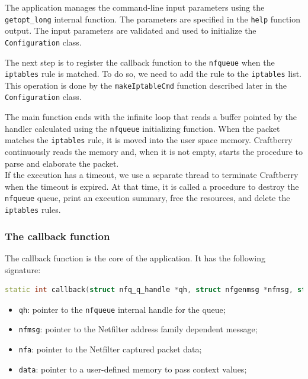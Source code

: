 \documentclass[12pt]{article}
\begin{document}
	The application manages the command-line input parameters using the \lstinline{getopt_long} internal function. The parameters are specified in the \lstinline{help} function output. The input parameters are validated and used to initialize the \lstinline{Configuration} class.\\
	\bigbreak

	The next step is to register the callback function to the \lstinline{nfqueue} when the \lstinline{iptables} rule is matched. To do so, we need to add the rule to the \lstinline{iptables} list. This operation is done by the \lstinline{makeIptableCmd} function described later in the \lstinline{Configuration} class.\\
	\bigbreak

	The main function ends with the infinite loop that reads a buffer pointed by the handler calculated using the \lstinline{nfqueue} initializing function. When the packet matches the \lstinline{iptables} rule, it is moved into the user space memory. Craftberry continuously reads the memory and, when it is not empty, starts the procedure to parse and elaborate the packet.\\

	If the execution has a timeout, we use a separate thread to terminate Craftberry when the timeout is expired. At that time, it is called a procedure to destroy the \lstinline{nfqueue} queue, print an execution summary, free the resources, and delete the \lstinline{iptables} rules.

	\subsubsection{The callback function}

	The callback function is the core of the application. It has the following signature:
	\bigbreak
	
	\begin{lstlisting}[frame=single, language=C++]
		static int callback(struct nfq_q_handle *qh, struct nfgenmsg *nfmsg, struct nfq_data *nfa, void *data);
	\end{lstlisting}
	\bigbreak

	\begin{itemize}
		\item \lstinline{qh}: pointer to the \lstinline{nfqueue} internal handle for the queue;
		\item \lstinline{nfmsg}: pointer to the Netfilter address family dependent message;
		\item \lstinline{nfa}: pointer to the Netfilter captured packet data;
		\item \lstinline{data}: pointer to a user-defined memory to pass context values;
	\end{itemize}
	\bigbreak
\end{document}
